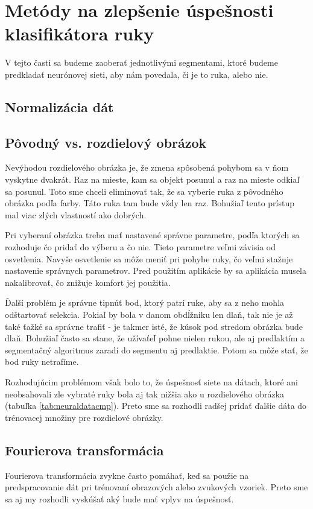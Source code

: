 
\section{Metódy na zlepšenie úspešnosti klasifikátora ruky}
\label{sect:metodyzlepseniaklasifikacie}

V tejto časti sa budeme zaoberať jednotlivými segmentami, ktoré budeme predkladať neurónovej sieti, aby nám povedala, či je to ruka, alebo nie.

\subsection{Normalizácia dát}

\subsection{Pôvodný vs. rozdielový obrázok}
Nevýhodou rozdielového obrázka je, že zmena spôsobená pohybom sa v ňom vyskytne dvakrát. Raz na mieste, kam sa objekt posunul a raz na mieste odkiaľ sa posunul. Toto sme chceli eliminovať tak, že sa vyberie ruka z pôvodného obrázka podľa farby. Táto ruka tam bude vždy len raz. Bohužiaľ tento prístup mal viac zlých vlastností ako dobrých.

Pri vyberaní obrázka treba mať nastavené správne parametre, podľa ktorých sa rozhoduje čo pridať do výberu a čo nie. Tieto parametre veľmi závisia od osvetlenia. Navyše osvetlenie sa môže meniť pri pohybe ruky, čo veľmi stažuje nastavenie správnych parametrov. Pred použitím aplikácie by sa aplikácia musela nakalibrovať, čo znižuje komfort jej použitia.

Ďalší problém je správne tipnúť bod, ktorý patrí ruke, aby sa z neho mohla odštartovať selekcia. Pokiaľ by bola v danom obdĺžniku len dlaň, tak nie je až také ťažké sa správne trafiť - je takmer isté, že kúsok pod stredom obrázka bude dlaň. Bohužiaľ často sa stane, že užívaťeľ pohne nielen rukou, ale aj predlaktím a segmentačný algoritmus zaradí do segmentu aj predlaktie. Potom sa môže stať, že bod ruky netrafíme.

Rozhodujúcim problémom však bolo to, že úspešnosť siete na dátach, ktoré ani neobsahovali zle vybraté ruky bola aj tak nižšia ako u rozdielového obrázka (tabuľka \ref{tab:neuraldatacmp}). Preto sme sa rozhodli radšej pridať ďalšie dáta do trénovacej množiny pre rozdielové obrázky.

\subsection{Fourierova transformácia}
Fourierova transformácia zvykne často pomáhať, keď sa použie na predspracovanie dát pri trénovaní obrazových alebo zvukových vzoriek. Preto sme sa aj my rozhodli vyskúšať aký bude mať vplyv na úspešnosť.


